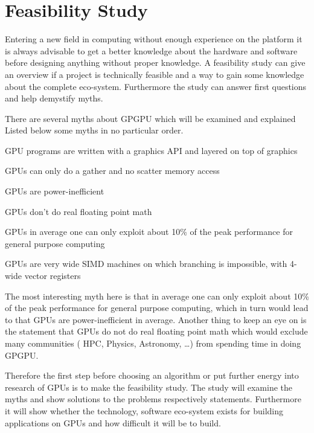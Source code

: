 
\chapter{Feasibility Study}
\label{chap:feas}
Entering a new field in computing without enough experience on the platform it 
is always advisable to get a better knowledge about the hardware and software before
designing anything without proper knowledge. A feasibility study can give an overview
if a project is technically feasible and a way to gain some knowledge about the
complete eco-system. Furthermore the study  can answer first questions and help
demystify myths. 

There are several myths about \gls{GPGPU} which will be examined and explained
Listed below some myths in no particular order.
\begin{enum}
	\item \Gls{GPU} programs are written with a graphics \gls{API} and layered on top 
		of graphics
	\label{enum:api}
	\item \Glspl{GPU} can only do a gather and no scatter memory access
	\label{enum:gather}
	\item \Glspl{GPU} are power-inefficient
	\label{enum:ineff}
	\item \Glspl{GPU} don't do real floating point math
	\label{enum:float}
	\item \Glspl{GPU} in average one can only exploit about 10\% of the peak 
		performance for general purpose computing
	\label{enum:exploit}
	\item \Glspl{GPU} are very wide \gls{SIMD} machines on which branching is 	  
		impossible, with 4-wide vector registers
 	\label{enum:simd}
\end{enum}

The most interesting myth here is that in average one can only exploit about
10\% of the peak performance for general purpose computing, which in turn would
lead to that \glspl{GPU} are power-inefficient in average. Another thing to keep
an eye on is the statement that \glspl{GPU} do not do real floating point math
which would exclude many communities ( \gls{HPC}, Physics, Astronomy, \ldots)
 from spending time in doing \gls{GPGPU}.

Therefore the first step before choosing an algorithm or put further energy into
research of \glspl{GPU} is to make the feasibility study. The study will examine
the myths and show solutions to the problems respectively statements.
Furthermore it will show whether the technology, software eco-system exists for
building applications on \glspl{GPU} and how difficult it will be to build.

